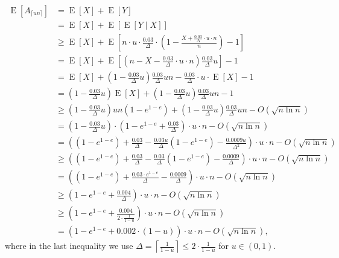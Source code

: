 \documentclass[11pt]{article}
\DeclareMathOperator*{\E}{E}
\begin{document}
\begin{appendixproof}
\begin{align*}
\E[A_{\lceil u n\rceil}] & = \E[X]  +\E[Y]\\
& = \E[X] + \E[\E[Y\mid X]] \\
&\geq \E[X] +\E\left[n\cdot u\cdot \frac{0.03}{\Delta} \cdot \left(1 - \frac{X+\frac{0.03}{\Delta}\cdot u\cdot n}{n}\right) - 1\right]\\
& = \E[X] + \E\left[\left(n - X - \frac{0.03}{\Delta}\cdot u \cdot n\right) \frac{0.03}{\Delta}u\right] - 1\\
& = \E[X] + \left(1-\frac{0.03}{\Delta}u\right)\frac{0.03}{\Delta}un - \frac{0.03}{\Delta}\cdot u \cdot \E[X] - 1\\
&= \left(1-\frac{0.03}{\Delta} u\right)\E[X] + \left(1-\frac{0.03}{\Delta}u\right)\frac{0.03}{\Delta}un -1\\
&\geq \left(1-\frac{0.03}{\Delta}u\right)un(1-e^{1-e}) + \left(1-\frac{0.03}{\Delta}u\right)\frac{0.03}{\Delta}un - O\left(\sqrt{n\ln n}\right)\\
& = \left(1-\frac{0.03}{\Delta}u\right)\cdot \left(1 -e^{1-e} + \frac{0.03}{\Delta}\right) \cdot u \cdot n - O\left(\sqrt{n\ln n}\right)\\
&= \left( (1-e^{1-e}) + \frac{0.03}\Delta -\frac{0.03u}\Delta(1-e^{1-e})  - \frac{0.0009u}{\Delta^2}\right) \cdot u \cdot n - O\left(\sqrt{n\ln n}\right)\\
&\ge \left( (1-e^{1-e}) + \frac{0.03}\Delta -\frac{0.03}\Delta(1-e^{1-e})  - \frac{0.0009}{\Delta}\right) \cdot u \cdot n - O\left(\sqrt{n\ln n}\right)\\
&= \left( (1-e^{1-e}) + \frac{0.03 \cdot e^{1-e}}\Delta   - \frac{0.0009}{\Delta}\right) \cdot u \cdot n - O\left(\sqrt{n\ln n}\right)\\
&\ge \left( 1-e^{1-e} + \frac{0.004}\Delta \right) \cdot u \cdot n - O\left(\sqrt{n\ln n}\right)\\
&\ge \left( 1-e^{1-e} + \frac{0.004}{2\cdot \frac1{1-u}}\right) \cdot u \cdot n - O\left(\sqrt{n\ln n}\right)\\
&= \left( 1-e^{1-e} + 0.002 \cdot (1-u)\right) \cdot u \cdot n - O\left(\sqrt{n\ln n}\right),
\end{align*}
where in the last inequality we use $\Delta=\left\lceil \frac{1}{1-u}\right\rceil \leq 2\cdot \frac{1}{1-u}$ for $u\in(0,1)$.
\end{appendixproof}
\end{document}
